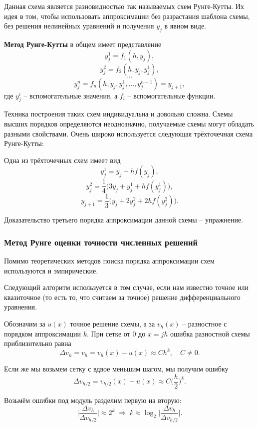 \documentclass[../main.tex]{subfile}
\begin{document}
Данная схема является разновидностью так называемых схем Рунге-Кутты. Их идея в
том, чтобы использовать аппроксимации без разрастания шаблона схемы, без
решения нелинейных уравнений и получения $y_j$ в явном виде.

\begin{define}
	\textbf{Метод Рунге-Кутты} в общем имеет представление
	\[y_j^1=f_1(h,y_j),\]
	\[y_j^2=f_2(h,y_j,y_j^1),\]
	\[...\]
	\[y_j^n=f_n(h,y_j,y_j^1,...,y_j^{n-1})=y_{j+1},\]
	где $y_j^i$ -- вспомогательные значения, а $f_i$ -- вспомогательные
	функции.
\end{define}

Техника построения таких схем индивидуальна и довольно сложна. Схемы высших
порядков определяются неоднозначно, получаемые схемы могут обладать разными
свойствами. Очень широко используется следующая трёхточечная схема Рунге-Кутты:

\begin{define}
	Одна из трёхточечных схем имеет вид
	\[y_j^1=y_j+hf(y_j),\]
	\[y_j^2=\frac{1}{4}\big(3y_j+y_j^1+hf(y_j^1)\big),\]
	\[y_{j+1}=\frac{1}{3}\big(y_j+2y_j^2+2hf(y_j^2)\big).\]
\end{define}

Доказательство третьего порядка аппроксимации данной схемы -- упражнение.

\subsubsection{Метод Рунге оценки точности численных решений}
Помимо теоретических методов поиска порядка аппроксимации схем используются и
эмпирические.

Следующий алгоритм используется в том случае, если нам известно точное или
квазиточное (то есть то, что считаем за точное) решение дифференциального
уравнения.

\begin{algorithm}
	Обозначим за $u(x)$ точное решение схемы, а за $v_h(x)$ -- разностное
	с порядком аппроксимации $k$. При сетке от 0 до $x=jh$ ошибка разностной
	схемы приблизительно равна
	\[\Delta v_h=v_h=v_h(x)-u(x)\approx Ch^k,\quad C\ne 0.\]

	Если же мы возьмем сетку с вдвое меньшим шагом, мы получим ошибку
	\[\Delta v_{h/2}=v_{h/2}(x)-u(x)\approx C\Big(\frac{h}{2}\Big)^k.\]

	Возьмём ошибки под модуль разделим первую на вторую:
	\[\Big|\frac{\Delta v_h}{\Delta v_{h/2}}\Big|\approx2^k\;\Rightarrow\;
	\boxed{k\approx\log_2{\Big|\frac{\Delta v_h}{\Delta v_{h/2}}\Big|}}.\]
\end{algorithm}
\end{document}
